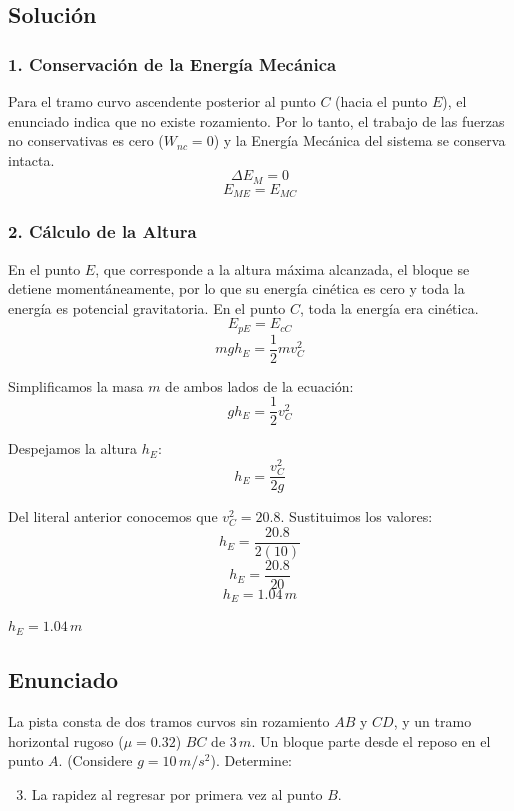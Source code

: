 \documentclass[12pt, a4paper]{article}
\begin{document}
\subsection*{Solución}

\subsubsection*{1. Conservación de la Energía Mecánica}
Para el tramo curvo ascendente posterior al punto $C$ (hacia el punto $E$), el enunciado indica que no existe rozamiento. Por lo tanto, el trabajo de las fuerzas no conservativas es cero ($W_{nc} = 0$) y la Energía Mecánica del sistema se conserva intacta.
$$ \Delta E_M = 0 $$
$$ E_{ME} = E_{MC} $$

\subsubsection*{2. Cálculo de la Altura}
En el punto $E$, que corresponde a la altura máxima alcanzada, el bloque se detiene momentáneamente, por lo que su energía cinética es cero y toda la energía es potencial gravitatoria. En el punto $C$, toda la energía era cinética.
$$ E_{pE} = E_{cC} $$
$$ m g h_E = \frac{1}{2} m v_C^2 $$

Simplificamos la masa $m$ de ambos lados de la ecuación:
$$ g h_E = \frac{1}{2} v_C^2 $$

Despejamos la altura $h_E$:
$$ h_E = \frac{v_C^2}{2g} $$

Del literal anterior conocemos que $v_C^2 = 20.8$. Sustituimos los valores:
$$ h_E = \frac{20.8}{2(10)} $$
$$ h_E = \frac{20.8}{20} $$
$$ h_E = 1.04 \, \si{m} $$

\begin{tcolorbox}[colback=green!5!white, colframe=green!50!black, title=Respuesta Final]
\centering $h_E = 1.04 \, \si{m}$
\end{tcolorbox}

\newpage

\subsection*{Enunciado}
La pista consta de dos tramos curvos sin rozamiento $AB$ y $CD$, y un tramo horizontal rugoso ($\mu = 0.32$) $BC$ de $3 \, \si{m}$. Un bloque parte desde el reposo en el punto $A$. (Considere $g = 10 \, \si{m/s^2}$). Determine:
\begin{enumerate}[label=\alph*)]
    \setcounter{enumi}{2}
    \item La rapidez al regresar por primera vez al punto $B$.
\end{enumerate}
\end{document}
